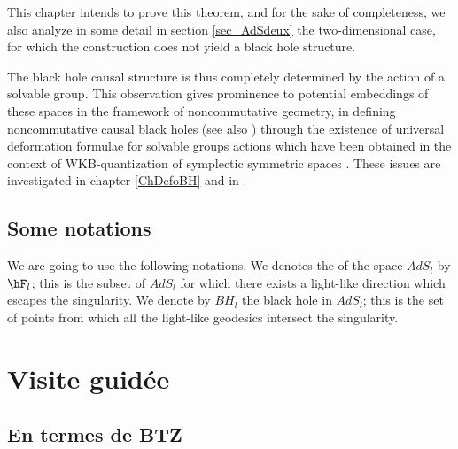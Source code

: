  This chapter intends to prove this theorem, and for the sake of completeness, we also analyze in some detail in section \ref{sec_AdSdeux} the two-dimensional case, for which the construction does not yield a black hole structure.

The black hole causal structure is thus completely determined by the action of a solvable group.  This observation gives prominence to potential embeddings of these spaces in the framework of noncommutative geometry, in defining noncommutative causal black holes (see also \cite{BDRS}) through the existence of universal deformation formulae for solvable groups actions which have been obtained in the context of WKB-quantization of symplectic symmetric spaces \cite{StrictSolvableSym,Biel-Massar-2}. These issues are investigated in chapter \ref{ChDefoBH} and in \cite{articleBVCS}.


					\subsection{Some notations}

We are going to use the following notations. We denotes the  of the space $AdS_l$ by $\hF_l$; this is the subset of $AdS_l$ for which there exists a light-like direction which escapes the singularity. We denote by $BH_l$ the black hole in $AdS_l$; this is the set of points from which all the light-like geodesics intersect the singularity.



\section{Visite guidée}

\subsection{En termes de BTZ}

